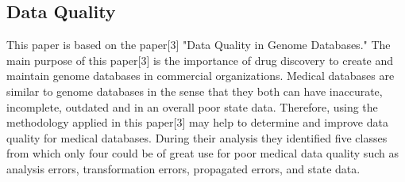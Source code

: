 \documentclass[sts]{sig-alternate}
\begin{document}
	\subsection{Data Quality}
		\label{Data Quality}
	
		This paper is based on the paper[3] "Data Quality in Genome Databases." The main purpose of this 		paper[3] is the importance of drug discovery to create and maintain genome databases in 					commercial organizations. Medical databases are similar to genome databases in the sense that 			they both can have inaccurate, incomplete, outdated and in an overall poor state data. 					Therefore, using the methodology applied in this paper[3] may help to determine and improve data 		quality for medical databases. During their analysis they identified five classes from which 				only four could be of great use for poor medical data quality such as analysis errors, 					transformation errors, propagated errors, and state data.
\end{document}
